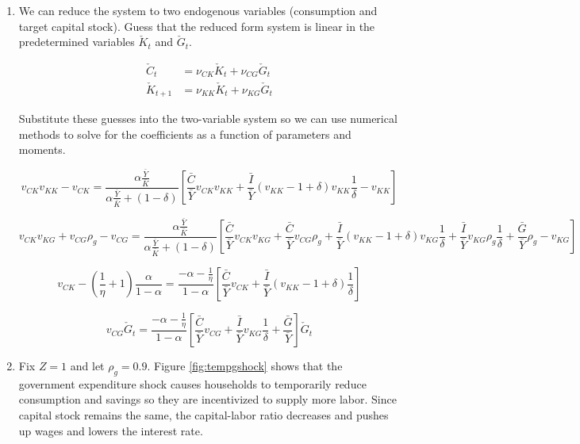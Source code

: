 \documentclass[11pt]{article}
\begin{document}
    \begin{enumerate}

        \item We can reduce the system to two endogenous variables (consumption and target capital stock). Guess that the reduced form system is linear in the predetermined variables $\check K_t$ and $\check G_t$.

            \begin{align*}
                \check C_t & = \nu_{CK} \check K_t + \nu_{CG} \check G_t \\
                \check K_{t+1} & = \nu_{KK} \check K_t + \nu_{KG} \check G_t
            \end{align*}

        Substitute these guesses into the two-variable system so we can use numerical methods to solve for the coefficients as a function of parameters and moments.

            $$ v_{CK} v_{KK} - v_{CK} = \frac{\alpha \frac{\bar{Y}}{\bar{K}}}{\alpha \frac{\bar{Y}}{\bar{K}} + (1-\delta)} \left[ \frac{\bar{C}}{\bar{Y}} v_{CK} v_{KK} + \frac{\bar{I}}{\bar{Y}} (v_{KK} - 1 + \delta) v_{KK} \frac{1}{\delta} - v_{KK} \right] $$

            $$ v_{CK} v_{KG} + v_{CG}\rho_g - v_{CG} = \frac{\alpha \frac{\bar{Y}}{\bar{K}}}{\alpha \frac{\bar{Y}}{\bar{K}} + (1-\delta)} \left[ \frac{\bar{C}}{\bar{Y}} v_{CK} v_{KG} + \frac{\bar{C}}{\bar{Y}} v_{CG} \rho_g + \frac{\bar{I}}{\bar{Y}} (v_{KK} - 1 + \delta) v_{KG} \frac{1}{\delta} + \frac{\bar{I}}{\bar{Y}} v_{KG} \rho_g \frac{1}{\delta} + \frac{\bar{G}}{\bar{Y}} \rho_g - v_{KG} \right] $$

            $$ v_{CK} - \left( \frac{1}{\eta} + 1 \right) \frac{\alpha}{1-\alpha} = \frac{-\alpha - \frac{1}{\eta}}{1-\alpha} \left[ \frac{\bar{C}}{\bar{Y}} v_{CK} + \frac{\bar{I}}{\bar{Y}} (v_{KK} - 1 + \delta) \frac{1}{\delta} \right] $$

            $$ v_{CG} \check{G}_t = \frac{-\alpha - \frac{1}{\eta}}{1-\alpha} \left[ \frac{\bar{C}}{\bar{Y}} v_{CG} + \frac{\bar{I}}{\bar{Y}} v_{KG} \frac{1}{\delta} + \frac{\bar{G}}{\bar{Y}} \right] \check{G}_{t} $$

        \item Fix $Z=1$ and let $\rho_g = 0.9$. Figure \ref{fig:tempgshock} shows that the government expenditure shock causes households to temporarily reduce consumption and savings so they are incentivized to supply more labor. Since capital stock remains the same, the capital-labor ratio decreases and pushes up wages and lowers the interest rate.


\end{enumerate}
\end{document}
